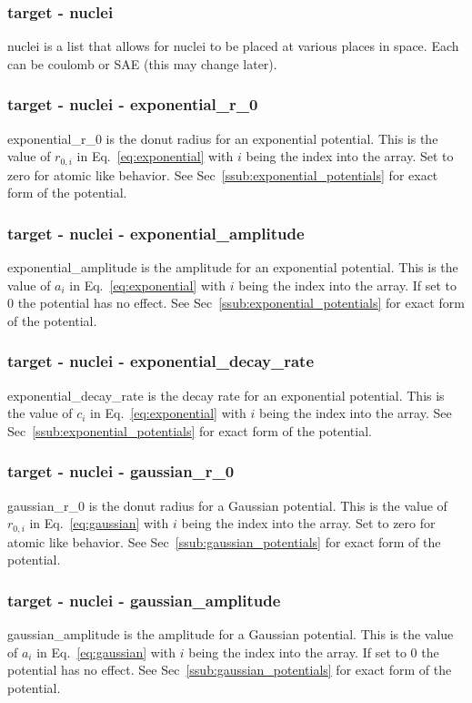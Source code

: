 \documentclass{article}
\begin{document}
\subsubsection{target - nuclei}
nuclei is a list that allows for nuclei to be placed at various places in space. Each can be coulomb or SAE (this may change later).

\subsubsection{target - nuclei - exponential\_r\_0}
exponential\_r\_0 is the donut radius for an exponential potential. This is the value of $r_{0,i}$ in Eq.~\ref{eq:exponential} with $i$ being the index into the array. Set to zero for atomic like behavior. See Sec~\ref{ssub:exponential_potentials} for exact form of the potential.

\subsubsection{target - nuclei - exponential\_amplitude}
exponential\_amplitude is the amplitude for an exponential potential. This is the value of $a_i$ in Eq.~\ref{eq:exponential} with $i$ being the index into the array. If set to 0 the potential has no effect. See Sec~\ref{ssub:exponential_potentials} for exact form of the potential.

\subsubsection{target - nuclei - exponential\_decay\_rate}
exponential\_decay\_rate is the decay rate for an exponential potential. This is the value of $c_i$ in Eq.~\ref{eq:exponential} with $i$ being the index into the array. See Sec~\ref{ssub:exponential_potentials} for exact form of the potential.

\subsubsection{target - nuclei - gaussian\_r\_0}
gaussian\_r\_0 is the donut radius for a Gaussian potential. This is the value of $r_{0,i}$ in Eq.~\ref{eq:gaussian} with $i$ being the index into the array. Set to zero for atomic like behavior. See Sec~\ref{ssub:gaussian_potentials} for exact form of the potential.

\subsubsection{target - nuclei - gaussian\_amplitude}
gaussian\_amplitude is the amplitude for a Gaussian potential. This is the value of $a_i$ in Eq.~\ref{eq:gaussian} with $i$ being the index into the array. If set to 0 the potential has no effect. See Sec~\ref{ssub:gaussian_potentials} for exact form of the potential.
\end{document}
